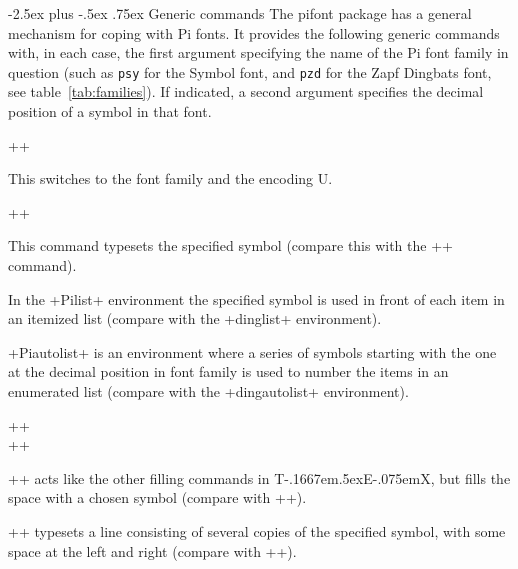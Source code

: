 \documentclass[11pt]{ltxguide}[1995/11/28]
\makeatletter
\renewcommand\subsection{\@startsection{subsection}{2}{\z@}%
{-2.5ex plus -.5ex}%
{.75ex}%
{\normalfont\large\bfseries}}
\def\ptmTeX{T\kern-.1667em\lower.5ex\hbox{E}\kern-.075emX\@}
\let\TeX=\ptmTeX
\newcommand{\Lpack}[1]{\textsf{#1}}
\makeatother
\begin{document}
\subsection{Generic commands}
The \Lpack{pifont} package has a general mechanism for coping with
Pi fonts. It provides the following generic commands with, in each case,
the first argument  specifying the name of the
Pi font family in question (such as \texttt{psy} for the Symbol font,
and \texttt{pzd} for the Zapf Dingbats font, see table~\vref{tab:families}).
If indicated, a second argument 
specifies the decimal position of a symbol in that font.

\begin{decl}
  +\Pifont+ 
\end{decl}

This switches to the font family 
and the encoding U.

\begin{decl}
  +\Pisymbol+  
\end{decl}

This command typesets the specified symbol
(compare this with the +\ding+ command).


In the +Pilist+ environment the specified symbol is used in front
of each item in an itemized list (compare with the +dinglist+
environment).

+Piautolist+ is an environment where a series of symbols starting
with the one at the decimal position  in font family
 is used to number the items in an enumerated list
(compare with the +dingautolist+ environment).

\begin{decl}
  +\Pifill+  \\
  +\Piline+  
\end{decl}

+\Pifill+ acts like the other filling commands in \TeX, but
fills the space with a chosen symbol (compare with +\dingfill+).

+\Piline+ typesets a line consisting of several copies of
the specified symbol, with some space at the left and right
(compare with +\dingline+).
\end{document}
